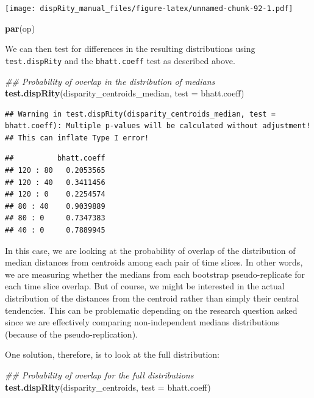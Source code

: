 \documentclass[]{book}
\newenvironment{Shaded}{\begin{snugshade}}{\end{snugshade}}
\newcommand{\CommentTok}[1]{\textcolor[rgb]{0.56,0.35,0.01}{\textit{#1}}}
\newcommand{\DataTypeTok}[1]{\textcolor[rgb]{0.13,0.29,0.53}{#1}}
\newcommand{\KeywordTok}[1]{\textcolor[rgb]{0.13,0.29,0.53}{\textbf{#1}}}
\newcommand{\NormalTok}[1]{#1}
\begin{document}
\texttt{[image: dispRity\_manual\_files/figure-latex/unnamed-chunk-92-1.pdf]}

\begin{Shaded}
\begin{Highlighting}[]
\KeywordTok{par}\NormalTok{(op)}
\end{Highlighting}
\end{Shaded}

We can then test for differences in the resulting distributions using \texttt{test.dispRity} and the \texttt{bhatt.coeff} test as described above.

\begin{Shaded}
\begin{Highlighting}[]
\CommentTok{## Probability of overlap in the distribution of medians}
\KeywordTok{test.dispRity}\NormalTok{(disparity_centroids_median, }\DataTypeTok{test =}\NormalTok{ bhatt.coeff)}
\end{Highlighting}
\end{Shaded}

\begin{verbatim}
## Warning in test.dispRity(disparity_centroids_median, test = bhatt.coeff): Multiple p-values will be calculated without adjustment!
## This can inflate Type I error!
\end{verbatim}

\begin{verbatim}
##          bhatt.coeff
## 120 : 80   0.2053565
## 120 : 40   0.3411456
## 120 : 0    0.2254574
## 80 : 40    0.9039889
## 80 : 0     0.7347383
## 40 : 0     0.7889945
\end{verbatim}

In this case, we are looking at the probability of overlap of the distribution of median distances from centroids among each pair of time slices.
In other words, we are measuring whether the medians from each bootstrap pseudo-replicate for each time slice overlap.
But of course, we might be interested in the actual distribution of the distances from the centroid rather than simply their central tendencies.
This can be problematic depending on the research question asked since we are effectively comparing non-independent medians distributions (because of the pseudo-replication).

One solution, therefore, is to look at the full distribution:

\begin{Shaded}
\begin{Highlighting}[]
\CommentTok{## Probability of overlap for the full distributions}
\KeywordTok{test.dispRity}\NormalTok{(disparity_centroids, }\DataTypeTok{test =}\NormalTok{ bhatt.coeff)}
\end{Highlighting}
\end{Shaded}
\end{document}

